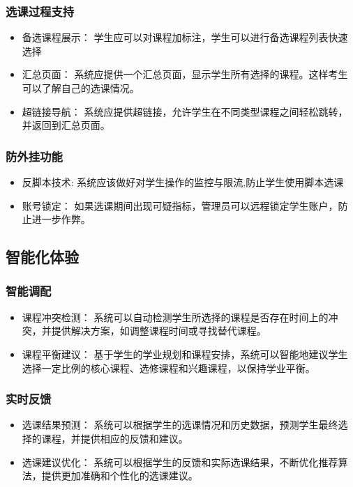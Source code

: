 \documentclass{article}
\begin{document}
\subsubsection{选课过程支持}
\begin{itemize}
        \item 备选课程展示： 学生应可以对课程加标注，学生可以进行备选课程列表快速选择
        \item 汇总页面： 系统应提供一个汇总页面，显示学生所有选择的课程。这样考生可以了解自己的选课情况。
        \item 超链接导航： 系统应提供超链接，允许学生在不同类型课程之间轻松跳转，并返回到汇总页面。
\end{itemize}

\subsubsection{防外挂功能}
\begin{itemize}
        \item 反脚本技术: 系统应该做好对学生操作的监控与限流,防止学生使用脚本选课
        \item 账号锁定： 如果选课期间出现可疑指标，管理员可以远程锁定学生账户，防止进一步作弊。
\end{itemize} 

\subsection{智能化体验}
\subsubsection{智能调配}
\begin{itemize}
\item 课程冲突检测： 系统可以自动检测学生所选择的课程是否存在时间上的冲突，并提供解决方案，如调整课程时间或寻找替代课程。
\item 课程平衡建议： 基于学生的学业规划和课程安排，系统可以智能地建议学生选择一定比例的核心课程、选修课程和兴趣课程，以保持学业平衡。
\end{itemize}

\subsubsection{实时反馈}
\begin{itemize}
\item 选课结果预测： 系统可以根据学生的选课情况和历史数据，预测学生最终选择的课程，并提供相应的反馈和建议。
\item 选课建议优化： 系统可以根据学生的反馈和实际选课结果，不断优化推荐算法，提供更加准确和个性化的选课建议。
\end{itemize}
\end{document}
